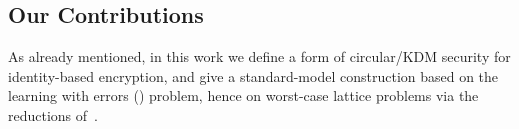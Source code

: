 

\subsection{Our Contributions}
\label{sec:contributions}

As already mentioned, in this work we define a form of circular/KDM
security for identity-based encryption, and give a standard-model
construction based on the learning with errors (\lwe) problem, hence
on worst-case lattice problems via the reductions
of~\cite{DBLP:journals/jacm/Regev09,DBLP:conf/stoc/Peikert09}.

